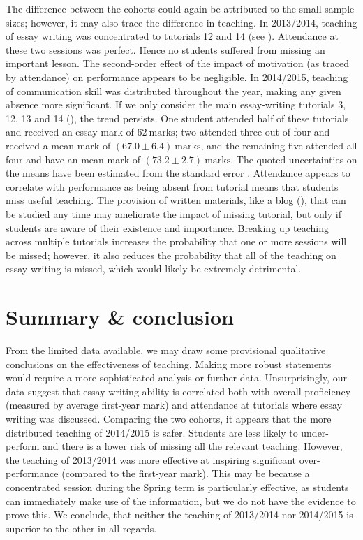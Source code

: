 The difference between the cohorts could again be attributed to the small sample sizes; however, it may also trace the difference in teaching. In 2013/2014, teaching of essay writing was concentrated to tutorials 12 and 14 (see ). Attendance at these two sessions was perfect. Hence no students suffered from missing an important lesson. The second-order effect of the impact of motivation (as traced by attendance) on performance appears to be negligible. In 2014/2015, teaching of communication skill was distributed throughout the year, making any given absence more significant. If we only consider the main essay-writing tutorials 3, 12, 13 and 14 (), the trend persists.  One student attended half of these tutorials and received an essay mark of $62~\mathrm{marks}$; two attended three out of four and received a mean mark of $(67.0\pm6.4)~\mathrm{marks}$, and the remaining five attended all four and have an mean mark of $(73.2\pm2.7)~\mathrm{marks}$. The quoted uncertainties on the means have been estimated from the standard error \citep[chapter 22]{Mackay2003}. Attendance appears to correlate with performance as being absent from tutorial means that students miss useful teaching. The provision of written materials, like a blog (), that can be studied any time may ameliorate the impact of missing tutorial, but only if students are aware of their existence and importance. Breaking up teaching across multiple tutorials increases the probability that one or more sessions will be missed; however, it also reduces the probability that all of the teaching on essay writing is missed, which would likely be extremely detrimental.

\section{Summary \& conclusion}\label{sec:marks-end}

From the limited data available, we may draw some provisional qualitative conclusions on the effectiveness of teaching. Making more robust statements would require a more sophisticated analysis or further data. Unsurprisingly, our data suggest that essay-writing ability is correlated both with overall proficiency (measured by average first-year mark) and attendance at tutorials where essay writing was discussed. Comparing the two cohorts, it appears that the more distributed teaching of 2014/2015 is safer. Students are less likely to under-perform and there is a lower risk of missing all the relevant teaching. However, the teaching of 2013/2014 was more effective at inspiring significant over-performance (compared to the first-year mark). This may be because a concentrated session during the Spring term is particularly effective, as students can immediately make use of the information, but we do not have the evidence to prove this. We conclude, that neither the teaching of 2013/2014 nor 2014/2015 is superior to the other in all regards.
